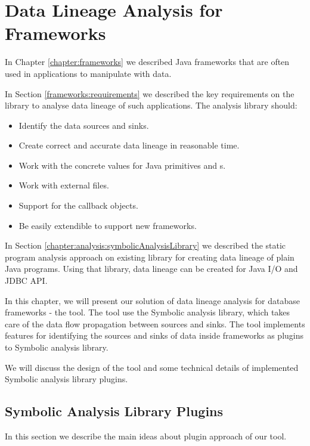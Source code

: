 
\chapter{Data Lineage Analysis for Frameworks \label{chapter:implementation}}

In Chapter \ref{chapter:frameworks} we described Java frameworks
that are often used in applications to manipulate with data.

In Section \ref{frameworks:requirements} we described the key requirements
on the library to analyse data lineage of such applications.
The analysis library should:
\begin{itemize}
  \item Identify the data sources and sinks.
  \item Create correct and accurate data lineage in reasonable time.
  \item Work with the concrete values for Java primitives and s.
  \item Work with external files.
  \item Support for the callback objects.
  \item Be easily extendible to support new frameworks.
\end{itemize}

In Section \ref{chapter:analysis:symbolicAnalysisLibrary} we described the
static program analysis approach on existing library for creating data lineage of plain Java programs.
Using that library, data lineage can be created for Java I/O and JDBC API.

In this chapter, we will present our solution of data lineage analysis
for database frameworks - the \ToolName tool.
The \ToolName tool use the Symbolic analysis library, which takes
care of the data flow propagation between sources and sinks.
The \ToolName tool implements features for identifying the sources
and sinks of data inside frameworks as plugins to Symbolic analysis library.

We will discuss the design of the \ToolName tool and some technical details
of implemented Symbolic analysis library plugins.




\section{Symbolic Analysis Library Plugins}

In this section we describe the main ideas about plugin approach of our \ToolName tool.

